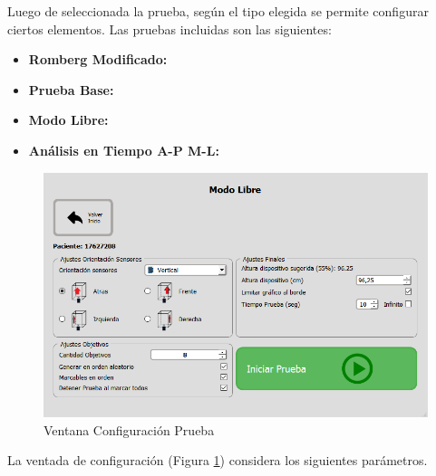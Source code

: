 \documentclass[12pt,a4paper]{article}
\begin{document}
Luego de seleccionada la prueba, según el tipo elegida se permite configurar ciertos elementos.
Las pruebas incluidas son las siguientes:
\begin{itemize}
	\item \textbf{Romberg Modificado:} 
	\item \textbf{Prueba Base:}
	\item \textbf{Modo Libre:}
	\item \textbf{Análisis en Tiempo A-P M-L:}
\end{itemize}
\begin{figure}[H]
	\centering
	\includegraphics[scale=0.6]{images/configurarPrueba}
	\caption{Ventana Configuración Prueba}
	\label{fig:configurarPrueba}
\end{figure}

La ventada de configuración (Figura \ref{fig:configurarPrueba}) considera los siguientes parámetros.
\end{document}
